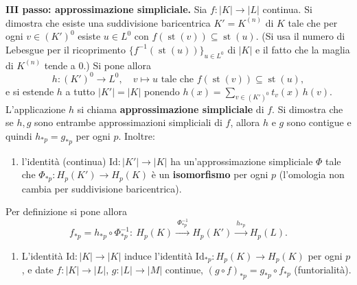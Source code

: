 \textbf{III passo: approssimazione simpliciale.} Sia $f: |K| \to |L|$ continua. Si dimostra che esiste una suddivisione baricentrica $K' = K^{(n)}$ di $K$ tale che per ogni $v \in (K')^0$ esiste $u \in L^0$ con $f(\operatorname{st}(v)) \subseteq \operatorname{st}(u)$. (Si usa il numero di Lebesgue per il ricoprimento $\{ f^{-1}(\operatorname{st}(u)) \}_{u \in L^0}$ di $|K|$ e il fatto che la maglia di $K^{(n)}$ tende a $0$.) Si pone allora
\[
h: (K')^0 \to L^0, \quad v \mapsto u \text{ tale che } f(\operatorname{st}(v)) \subseteq \operatorname{st}(u),
\]
e si estende $h$ a tutto $|K'| = |K|$ ponendo $h(x) = \sum_{v \in (K')^0} t_v(x)\, h(v)$. L'applicazione $h$ si chiama \textbf{approssimazione simpliciale} di $f$. Si dimostra che se $h, g$ sono entrambe approssimazioni simpliciali di $f$, allora $h$ e $g$ sono contigue e quindi $h_{*p} = g_{*p}$ per ogni $p$. Inoltre:
\begin{enumerate}
    \item[a)] l'identit\`a (continua) $\mathrm{Id}: |K'| \to |K|$ ha un'approssimazione simpliciale $\Phi$ tale che $\Phi_{*p}: H_p(K') \to H_p(K)$ \`e un \textbf{isomorfismo} per ogni $p$ (l'omologia non cambia per suddivisione baricentrica).
\end{enumerate}
Per definizione si pone allora
\[
f_{*p} = h_{*p} \circ \Phi_{*p}^{-1}: \ H_p(K) \xrightarrow{\ \Phi_{*p}^{-1}\ } H_p(K') \xrightarrow{\ h_{*p}\ } H_p(L).
\]
\begin{enumerate}
    \item[b)] L'identit\`a $\mathrm{Id}: |K| \to |K|$ induce l'identit\`a $\mathrm{Id}_{*p}: H_p(K) \to H_p(K)$ per ogni $p$, e date $f: |K| \to |L|$, $g: |L| \to |M|$ continue, $(g \circ f)_{*p} = g_{*p} \circ f_{*p}$ (funtorialit\`a).
\end{enumerate}

